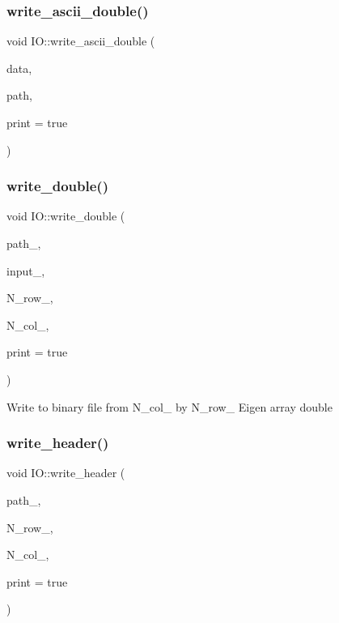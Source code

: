 \subsubsection{\texorpdfstring{write\+\_\+ascii\+\_\+double()}{write\_ascii\_double()}}
{\footnotesize\ttfamily void I\+O\+::write\+\_\+ascii\+\_\+double (\begin{DoxyParamCaption}\item[{Array\+Xd}]{data,  }\item[{std\+::string}]{path,  }\item[{bool}]{print = {\ttfamily true} }\end{DoxyParamCaption})}

\mbox{\label{class_i_o_a9a648215dc5e33abe2c5a8916fff06d4}} 
\subsubsection{\texorpdfstring{write\+\_\+double()}{write\_double()}}
{\footnotesize\ttfamily void I\+O\+::write\+\_\+double (\begin{DoxyParamCaption}\item[{const std\+::string}]{path\+\_\+,  }\item[{Array\+X\+Xd}]{input\+\_\+,  }\item[{int}]{N\+\_\+row\+\_\+,  }\item[{int}]{N\+\_\+col\+\_\+,  }\item[{bool}]{print = {\ttfamily true} }\end{DoxyParamCaption})}

Write to binary file from N\+\_\+col\+\_\+ by N\+\_\+row\+\_\+ Eigen array double\mbox{\label{class_i_o_a0db950886bb1e6d5571330f771974c4e}} 
\subsubsection{\texorpdfstring{write\+\_\+header()}{write\_header()}}
{\footnotesize\ttfamily void I\+O\+::write\+\_\+header (\begin{DoxyParamCaption}\item[{const std\+::string}]{path\+\_\+,  }\item[{int}]{N\+\_\+row\+\_\+,  }\item[{int}]{N\+\_\+col\+\_\+,  }\item[{bool}]{print = {\ttfamily true} }\end{DoxyParamCaption})}

